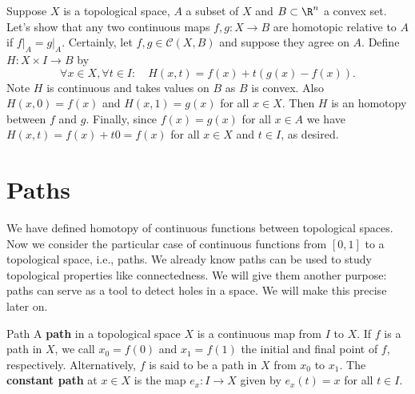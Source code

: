 \begin{example}
    


Suppose \(X\) is a topological space, \(A \) a subset of \(X\) and  \(B\subset \R^n\) a  convex set. Let's show that any two continuous maps \(f,g\colon X\to B\) are homotopic relative to \(A\) if \(f\rvert_{A} = g\rvert_A\). Certainly, let \(f,g\in \mathcal{C}(X,B)\)   and suppose they agree on \(A\). Define \(H\colon X\times I\to B\) by \[
    \forall x\in X,\forall t\in I:\quad H(x,t) = f(x) + t(g(x) - f(x)).
\] Note \(H\) is continuous and takes values on \(B\) as \(B\) is convex. Also \(H(x,0) = f(x)\) and \(H(x,1) = g(x)\) for all \(x\in X\).
Then \(H\) is an homotopy between \(f\) and \(g\).  Finally, since \(f(x) = g(x)\) for all \(x\in A\) we have \(H(x,t) = f(x) + t 0 = f(x)\) for all \(x\in X\) and \(t\in I\), as desired. 
\end{example}




\section{Paths}

We have defined homotopy of continuous functions between topological spaces. Now we consider  the particular case of continuous functions from \([0,1]\) to a topological space, i.e., paths. We already know paths can be used to study topological properties like connectedness. We will give them another purpose: paths can serve as a tool to detect holes in a space. We will make this precise later on.

\begin{definition}{Path}{}
    A \textbf{path} in a topological space \(X\) is a continuous map from \(I\) to \(X\). If \(f\) is a path in \(X\), we call \(x_0=f(0)\) and \(x_1=f(1)\) the initial and final point of \(f\), respectively. Alternatively, \(f\) is said to be a path in \(X\) from \(x_0\) to \(x_1\).
    The \textbf{constant path} at \(x\in X\) is the map \(e_{x}\colon I\to X\) given by \(e_x (t) = x\) for all \(t\in I\).
\end{definition}

